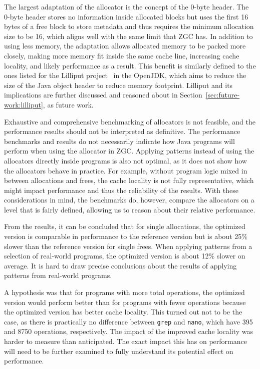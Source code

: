 
The largest adaptation of the allocator is the concept of the 0-byte header. The 0-byte header stores no information inside allocated blocks but uses the first 16 bytes of a free block to store metadata and thus requires the minimum allocation size to be 16, which aligns well with the same limit that ZGC has. In addition to using less memory, the adaptation allows allocated memory to be packed more closely, making more memory fit inside the same cache line, increasing cache locality, and likely performance as a result. This benefit is similarly defined to the ones listed for the Lilliput project~\cite{lilliput} in the OpenJDK, which aims to reduce the size of the Java object header to reduce memory footprint. Lilliput and its implications are further discussed and reasoned about in Section~\ref{sec:future-work:lilliput}, as future work.

Exhaustive and comprehensive benchmarking of allocators is not feasible, and the performance results should not be interpreted as definitive. The performance benchmarks and results do not necessarily indicate how Java programs will perform when using the allocator in ZGC. Applying patterns instead of using the allocators directly inside programs is also not optimal, as it does not show how the allocators behave in practice. For example, without program logic mixed in between allocations and frees, the cache locality is not fully representative, which might impact performance and thus the reliability of the results. With these considerations in mind, the benchmarks do, however, compare the allocators on a level that is fairly defined, allowing us to reason about their relative performance. 

From the results, it can be concluded that for single allocations, the optimized version is comparable in performance to the reference version but is about 25\% slower than the reference version for single frees. When applying patterns from a selection of real-world programs, the optimized version is about 12\% slower on average. It is hard to draw precise conclusions about the results of applying patterns from real-world programs. 

A hypothesis was that for programs with more total operations, the optimized version would perform better than for programs with fewer operations because the optimized version has better cache locality. This turned out not to be the case, as there is practically no difference between \texttt{grep} and \texttt{nano}, which have 395 and 8750 operations, respectively. The impact of the improved cache locality was harder to measure than anticipated. The exact impact this has on performance will need to be further examined to fully understand its potential effect on performance.

